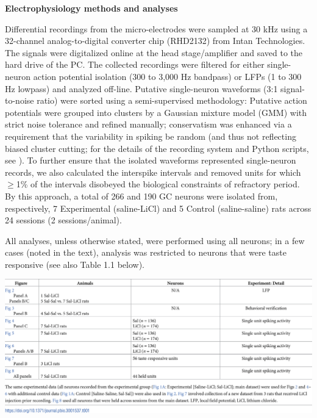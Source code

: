 \begin{refsection}
\smallskip
\noindent\textbf{Electrophysiology methods and analyses}\par
\noindent 
Differential recordings from the micro-electrodes were sampled at 30 kHz using a 32-channel analog-to-digital converter chip (RHD2132) from Intan Technologies. The signals were digitalized online at the head stage/amplifier and saved to the hard drive of the PC. The collected recordings were filtered for either single-neuron action potential isolation (300 to 3,000 Hz bandpass) or LFPs (1 to 300 Hz lowpass) and analyzed off-line. Putative single-neuron waveforms (3:1 signal-to-noise ratio) were sorted using a semi-supervised methodology: Putative action potentials were grouped into clusters by a Gaussian mixture model (GMM) with strict noise tolerance and refined manually; conservatism was enhanced via a requirement that the variability in spiking be random (and thus not reflecting biased cluster cutting; for the details of the recording system and Python scripts, see \cite{mukherjee2017a}). To further ensure that the isolated waveforms represented single-neuron records, we also calculated the interspike intervals and removed units for which \(\ge\)1\% of the intervals disobeyed the biological constraints of refractory period. By this approach, a total of 266 and 190 GC neurons were isolated from, respectively, 7 Experimental (saline-LiCl) and 5 Control (saline-saline) rats across 24 sessions (2 sessions/animal).

All analyses, unless otherwise stated, were performed using all neurons; in a few cases (noted in the text), analysis was restricted to neurons that were taste responsive (see also Table 1.1 below).

\begin{tabular}
\centering
    \includegraphics[width=\linewidth]{stone_2022_figs/journal.pbio.3001537.t001.png}
\end{tabular}


\end{refsection}
